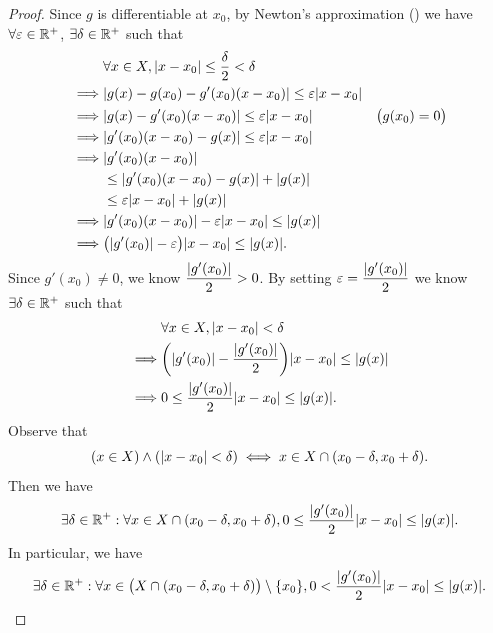 \begin{proof}
  Since \(g\) is differentiable at \(x_0\), by Newton's approximation () we have \(\forall \varepsilon \in \mathbb{R}^+\), \(\exists \delta \in \mathbb{R}^+\) such that
  \begin{align*}
             & \forall x \in X, \abs{x - x_0} \leq \dfrac{\delta}{2} < \delta                               \\
    \implies & \abs{g(x) - g(x_0) - g'(x_0)(x - x_0)} \leq \varepsilon \abs{x - x_0}                        \\
    \implies & \abs{g(x) - g'(x_0)(x - x_0)} \leq \varepsilon \abs{x - x_0}          & \big(g(x_0) = 0\big) \\
    \implies & \abs{g'(x_0)(x - x_0) - g(x)} \leq \varepsilon \abs{x - x_0}                                 \\
    \implies & \abs{g'(x_0)(x - x_0)}                                                                       \\
             & \leq \abs{g'(x_0)(x - x_0) - g(x)} + \abs{g(x)}                                              \\
             & \leq \varepsilon \abs{x - x_0} + \abs{g(x)}                                                  \\
    \implies & \abs{g'(x_0)(x - x_0)} - \varepsilon \abs{x - x_0} \leq \abs{g(x)}                           \\
    \implies & \big(\abs{g'(x_0)} - \varepsilon\big)\abs{x - x_0} \leq \abs{g(x)}.
  \end{align*}
  Since \(g'(x_0) \neq 0\), we know \(\dfrac{\left\lvert g'(x_0)\right\rvert}{2} > 0\).
  By setting \(\varepsilon = \dfrac{\left\lvert g'(x_0)\right\rvert}{2}\) we know \(\exists \delta \in \mathbb{R}^+\) such that
  \begin{align*}
             & \forall x \in X, \abs{x - x_0} < \delta                                            \\
    \implies & \bigg(\abs{g'(x_0)} - \dfrac{\abs{g'(x_0)}}{2}\bigg) \abs{x - x_0} \leq \abs{g(x)} \\
    \implies & 0 \leq \dfrac{\abs{g'(x_0)}}{2} \abs{x - x_0} \leq \abs{g(x)}.
  \end{align*}
  Observe that
  \[
    (x \in X) \land (\left\lvert x - x_0\right\rvert < \delta) \iff x \in X \cap (x_0 - \delta, x_0 + \delta).
  \]
  Then we have
  \[
    \exists \delta \in \R^+ : \forall x \in X \cap (x_0 - \delta, x_0 + \delta), 0 \leq \dfrac{\abs{g'(x_0)}}{2} \abs{x - x_0} \leq \abs{g(x)}.
  \]
  In particular, we have
  \[
    \exists \delta \in \R^+ : \forall x \in \big(X \cap (x_0 - \delta, x_0 + \delta)\big) \setminus \set{x_0}, 0 < \dfrac{\abs{g'(x_0)}}{2} \abs{x - x_0} \leq \abs{g(x)}.
\]
\end{proof}
